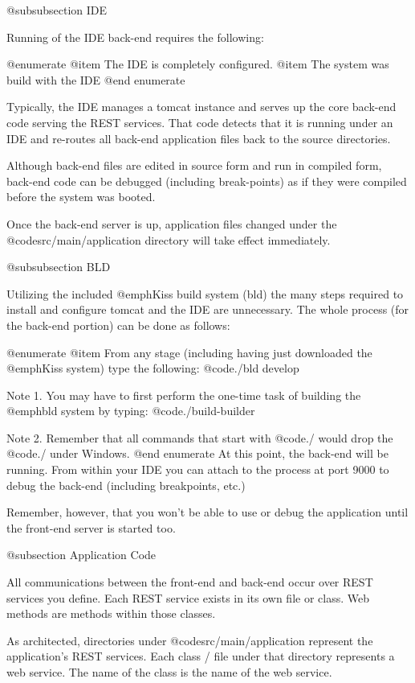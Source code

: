 @subsubsection IDE

Running of the IDE back-end requires the following:

@enumerate
@item
The IDE is completely configured.
@item
The system was build with the IDE
@end enumerate

Typically, the IDE manages a tomcat instance and serves up the core
back-end code serving the REST services.  That code detects that it is
running under an IDE and re-routes all back-end application files back
to the source directories.

Although back-end files are edited in source form and run in compiled
form, back-end code can be debugged (including break-points) as if
they were compiled before the system was booted.

Once the back-end server is up, application files changed under the
@code{src/main/application} directory will take effect immediately.

@subsubsection BLD

Utilizing the included @emph{Kiss build system (bld)} the many steps required 
to install and configure tomcat and the IDE are unnecessary.  The whole process
(for the back-end portion) can be done as follows:

@enumerate
@item
From any stage (including having just downloaded the @emph{Kiss} system) type
the following:  @code{./bld develop}

Note 1.  You may have to first perform the one-time task of building
the @emph{bld} system by typing: @code{./build-builder}

Note 2.  Remember that all commands that start with @code{./} would drop
the @code{./} under Windows.
@end enumerate
At this point, the back-end will be running.  From within your IDE you
can attach to the process at port 9000 to debug the back-end (including
breakpoints, etc.)

Remember, however, that you won't be able to use or debug the application until
the front-end server is started too.

@subsection Application Code

All communications between the front-end and back-end occur over REST
services you define.  Each REST service exists in its own
file or class.  Web methods are methods within those classes.

As architected, directories under @code{src/main/application}
represent the application's REST services.  Each class / file under that
directory represents a web service.  The name of the class is the name
of the web service.

